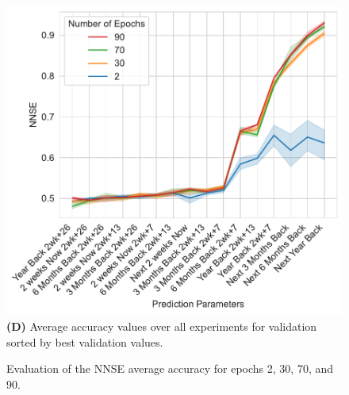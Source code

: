 \documentclass[utf8]{FrontiersinVancouver} %
\begin{document}
\begin{figure}[p]
\begin{center}
\begin{minipage}[t]{0.49\textwidth}
     \end{minipage}
  \ \
     \begin{minipage}[t]{0.49\textwidth}
        \includegraphics[width=1.0\linewidth]{images/NNSE-all-epochs-validation}
        {\bf (D)} Average accuracy values over all experiments for validation sorted by best validation values.
     \end{minipage}

  \end{center}

  \caption {Evaluation of the NNSE average accuracy for epochs 2, 30, 70, and 90.}
  \label{fig:NNSE-comparison-a100}

\end{figure}
\end{document}
